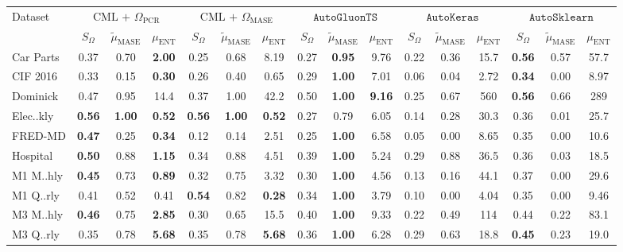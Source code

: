 
    \begin{tabular}{l|ccc|ccc|ccc|ccc|ccc}
        \toprule 
        Dataset & \multicolumn{3}{c}{$\text{CML + } \Omega_\text{PCR}$} & \multicolumn{3}{c}{$\text{CML + } \Omega_\text{MASE}$} & \multicolumn{3}{c}{$\texttt{AutoGluonTS}$} & \multicolumn{3}{c}{$\texttt{AutoKeras}$} & \multicolumn{3}{c}{$\texttt{AutoSklearn}$} \\
          & $S_\Omega$ & $\tilde{\mu}_{\text{MASE}}$ & $\mu_{\text{ENT}}$ & $S_\Omega$ & $\tilde{\mu}_{\text{MASE}}$ & $\mu_{\text{ENT}}$ & $S_\Omega$ & $\tilde{\mu}_{\text{MASE}}$ & $\mu_{\text{ENT}}$ & $S_\Omega$ & $\tilde{\mu}_{\text{MASE}}$ & $\mu_{\text{ENT}}$ & $S_\Omega$ & $\tilde{\mu}_{\text{MASE}}$ & $\mu_{\text{ENT}}$ \\
        \midrule
        Car Parts & 0.37 & 0.70 & \textbf{2.00} & 0.25 & 0.68 & 8.19 & 0.27 & \textbf{0.95} & 9.76 & 0.22 & 0.36 & 15.7 & \textbf{0.56} & 0.57 & 57.7 \\
        CIF 2016 & 0.33 & 0.15 & \textbf{0.30} & 0.26 & 0.40 & 0.65 & 0.29 & \textbf{1.00} & 7.01 & 0.06 & 0.04 & 2.72 & \textbf{0.34} & 0.00 & 8.97 \\
        Dominick & 0.47 & 0.95 & 14.4 & 0.37 & 1.00 & 42.2 & 0.50 & \textbf{1.00} & \textbf{9.16} & 0.25 & 0.67 & 560 & \textbf{0.56} & 0.66 & 289 \\
        Elec..kly & \textbf{0.56} & \textbf{1.00} & \textbf{0.52} & \textbf{0.56} & \textbf{1.00} & \textbf{0.52} & 0.27 & 0.79 & 6.05 & 0.14 & 0.28 & 30.3 & 0.36 & 0.01 & 25.7 \\
        FRED-MD & \textbf{0.47} & 0.25 & \textbf{0.34} & 0.12 & 0.14 & 2.51 & 0.25 & \textbf{1.00} & 6.58 & 0.05 & 0.00 & 8.65 & 0.35 & 0.00 & 10.6 \\
        Hospital & \textbf{0.50} & 0.88 & \textbf{1.15} & 0.34 & 0.88 & 4.51 & 0.39 & \textbf{1.00} & 5.24 & 0.29 & 0.88 & 36.5 & 0.36 & 0.03 & 18.5 \\
        M1 M..hly & \textbf{0.45} & 0.73 & \textbf{0.89} & 0.32 & 0.75 & 3.32 & 0.30 & \textbf{1.00} & 4.56 & 0.13 & 0.16 & 44.1 & 0.37 & 0.00 & 29.6 \\
        M1 Q..rly & 0.41 & 0.52 & 0.41 & \textbf{0.54} & 0.82 & \textbf{0.28} & 0.34 & \textbf{1.00} & 3.79 & 0.10 & 0.00 & 4.04 & 0.35 & 0.00 & 9.46 \\
        M3 M..hly & \textbf{0.46} & 0.75 & \textbf{2.85} & 0.30 & 0.65 & 15.5 & 0.40 & \textbf{1.00} & 9.33 & 0.22 & 0.49 & 114 & 0.44 & 0.22 & 83.1 \\
        M3 Q..rly & 0.35 & 0.78 & \textbf{5.68} & 0.35 & 0.78 & \textbf{5.68} & 0.36 & \textbf{1.00} & 6.28 & 0.29 & 0.63 & 18.8 & \textbf{0.45} & 0.23 & 19.0 \\

\end{tabular}
